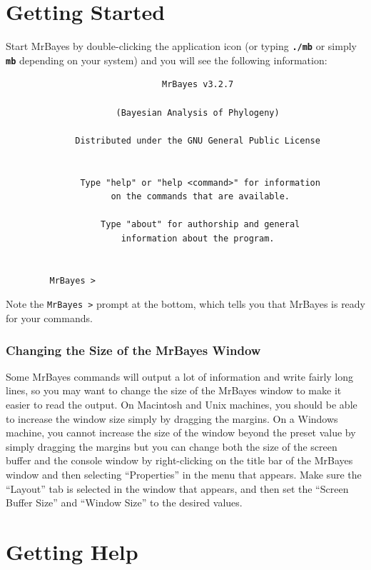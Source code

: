 \documentclass[12pt]{book}
\newcommand{\ttt}[1]{\texttt{#1}}
\newcommand{\tb}[1]{\ttt{\textbf{#1}}}
\begin{document}
\section{Getting Started}

Start MrBayes by double-clicking the application icon (or typing \tb{./mb} or simply \tb{mb}
depending on your system) and you will see the following information:

\begin{figure}[h]\singlespacing\footnotesize
\begin{verbatim}
                         MrBayes v3.2.7

                (Bayesian Analysis of Phylogeny)

        Distributed under the GNU General Public License


         Type "help" or "help <command>" for information
               on the commands that are available.

             Type "about" for authorship and general
                 information about the program.


   MrBayes >
\end{verbatim}\end{figure}

Note the \ttt{MrBayes >} prompt at the bottom, which tells you that MrBayes is ready for your
commands.

\subsubsection{Changing the Size of the MrBayes Window}

Some MrBayes commands will output a lot of information and write fairly long lines, so you may want
to change the size of the MrBayes window to make it easier to read the output. On Macintosh and
Unix machines, you should be able to increase the window size simply by dragging the margins. On a
Windows machine, you cannot increase the size of the window beyond the preset value by simply
dragging the margins but you can change both the size of the screen buffer and the console window
by right-clicking on the title bar of the MrBayes window and then selecting ``Properties'' in the
menu that appears. Make sure the ``Layout'' tab is selected in the window that appears, and then
set the ``Screen Buffer Size'' and ``Window Size'' to the desired values.

\section{Getting Help}
\label{gettingHelp}
\end{document}
